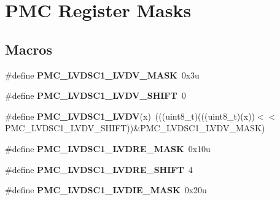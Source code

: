 \hypertarget{group___p_m_c___register___masks}{}\section{P\+MC Register Masks}
\label{group___p_m_c___register___masks}
\subsection*{Macros}
\begin{DoxyCompactItemize}
\item 
\mbox{\label{group___p_m_c___register___masks_ga777eada2a526d88569a30323e9d3e1d3}} 
\#define {\bfseries P\+M\+C\+\_\+\+L\+V\+D\+S\+C1\+\_\+\+L\+V\+D\+V\+\_\+\+M\+A\+SK}~0x3u
\item 
\mbox{\label{group___p_m_c___register___masks_gaaf45daa6de387f93bc57f1218ab17a16}} 
\#define {\bfseries P\+M\+C\+\_\+\+L\+V\+D\+S\+C1\+\_\+\+L\+V\+D\+V\+\_\+\+S\+H\+I\+FT}~0
\item 
\mbox{\label{group___p_m_c___register___masks_gae2cf4048ec29cc1a54349d8bc18e27e4}} 
\#define {\bfseries P\+M\+C\+\_\+\+L\+V\+D\+S\+C1\+\_\+\+L\+V\+DV}(x)~(((uint8\+\_\+t)(((uint8\+\_\+t)(x))$<$$<$P\+M\+C\+\_\+\+L\+V\+D\+S\+C1\+\_\+\+L\+V\+D\+V\+\_\+\+S\+H\+I\+FT))\&P\+M\+C\+\_\+\+L\+V\+D\+S\+C1\+\_\+\+L\+V\+D\+V\+\_\+\+M\+A\+SK)
\item 
\mbox{\label{group___p_m_c___register___masks_gad771f87e373907e3ef60e5fa31001fad}} 
\#define {\bfseries P\+M\+C\+\_\+\+L\+V\+D\+S\+C1\+\_\+\+L\+V\+D\+R\+E\+\_\+\+M\+A\+SK}~0x10u
\item 
\mbox{\label{group___p_m_c___register___masks_ga056ca878a20782f5bf65b3be3e98581d}} 
\#define {\bfseries P\+M\+C\+\_\+\+L\+V\+D\+S\+C1\+\_\+\+L\+V\+D\+R\+E\+\_\+\+S\+H\+I\+FT}~4
\item 
\mbox{\label{group___p_m_c___register___masks_ga1e7518c88ea0037d099124a643788363}} 
\#define {\bfseries P\+M\+C\+\_\+\+L\+V\+D\+S\+C1\+\_\+\+L\+V\+D\+I\+E\+\_\+\+M\+A\+SK}~0x20u
\item 
$$
\end{DoxyCompactItemize}
